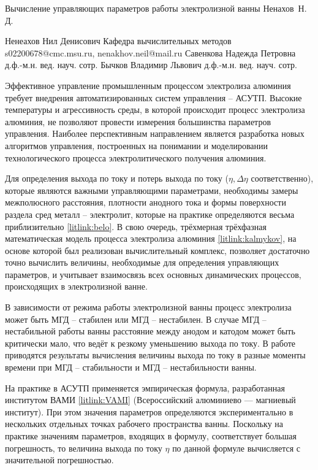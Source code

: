 \begin{vkrthesis}%
{
Вычисление управляющих параметров работы электролизной ванны
}%
{Ненахов~Н.\,Д.}%

\VKRAuthorDetailsSupervisorConsultant%
{Ненеахов Нил Денисович}%
{Кафедра вычислительных методов}%
{s02200678@cmc.msu.ru, nenakhov.neil@mail.ru}%
{Савенкова Надежда Петровна}%
{д.ф.-м.н.}%
{вед. науч. сотр.}%
{Бычков Владимир Львович}%
{д.ф.-м.н.}%
{вед. науч. сотр.}%
{}%

\newcommand{\tbs}{\textbackslash}

Эффективное управление промышленным процессом электролиза алюминия требует внедрения автоматизированных систем управления – АСУТП.  Высокие температуры и агрессивность среды, в которой происходит процесс электролиза алюминия, не позволяют провести измерения большинства параметров управления. Наиболее перспективным направлением является разработка новых алгоритмов управления, построенных на понимании и моделировании технологического процесса электролитического получения алюминия. 

Для определения выхода по току и потерь выхода по току ($\eta, \Delta \eta$ соответственно), которые являются важными управляющими параметрами, необходимы замеры межполюсного расстояния, плотности анодного тока и формы поверхности раздела сред металл -- электролит, которые на практике определяются весьма приблизительно \ref{litlink:belo}. В свою очередь, трёхмерная трёхфазная математическая модель процесса электролиза алюминия \ref{litlink:kalmykov}, на основе которой был реализован вычислительный комплекс, позволяет достаточно точно вычислить величины, необходимые для определения управляющих параметров, и учитывает взаимосвязь всех основных динамических процессов, происходящих в электролизной ванне.

В зависимости от режима работы электролизной ванны процесс электролиза может быть МГД -- стабилен или МГД -- нестабилен. В случае МГД -- нестабильной работы ванны расстояние между анодом и катодом может быть критически мало, что ведёт к резкому уменьшению выхода по току. В работе приводятся результаты вычисления величины выхода по току в разные моменты времени при МГД -- стабильности и МГД -- нестабильности ванны. 

На практике в АСУТП применяется эмпирическая формула, разработанная институтом ВАМИ \ref{litlink:VAMI} (Всероссийский алюминиево --- магниевый институт).
При этом значения параметров определяются экспериментально в нескольких отдельных точках рабочего пространства ванны.
Поскольку на практике значениям параметров, входящих в формулу, соответствует большая погрешность, то величина выхода по току $\eta$ по данной формуле вычисляется с значительной погрешностью.


\end{vkrthesis}
